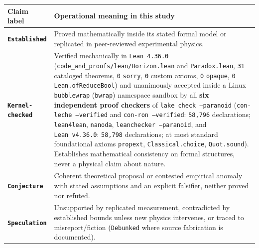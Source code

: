 \documentclass[10pt,letterpaper]{article}
\newcounter{none}
\begin{document}
{\def\LTcaptype{none} %
{\footnotesize\setlength{\tabcolsep}{3.8pt}\renewcommand{\arraystretch}{1.15}
\begin{longtable}[]{@{}
  >{\raggedright\arraybackslash}p{}
  >{\raggedright\arraybackslash}p{}@{}}
\toprule\noalign{}
\begin{minipage}[b]{\linewidth}\raggedright
\textbf{Claim label}
\end{minipage} & \begin{minipage}[b]{\linewidth}\raggedright
\textbf{Operational meaning in this study}
\end{minipage} \\
\midrule\noalign{}
\endhead
\bottomrule\noalign{}
\endlastfoot
\textbf{\texttt{Established}} & Proved mathematically inside its stated
formal model or replicated in peer-reviewed experimental physics. \\
\textbf{\texttt{Kernel-\allowbreak{}checked}} & Verified mechanically in
\texttt{Lean\ 4.\allowbreak{}36.\allowbreak{}0} (\texttt{code\_\allowbreak{}and\_\allowbreak{}proofs/\allowbreak{}lean/\allowbreak{}Horizon.\allowbreak{}lean} and
\texttt{Paradox.\allowbreak{}lean}, \texttt{31} cataloged theorems, \texttt{0}
\texttt{sorry}, \texttt{0} custom axioms, \texttt{0} \texttt{opaque},
\texttt{0} \texttt{Lean.\allowbreak{}ofReduceBool}) and unanimously accepted inside
a Linux \texttt{bubblewrap} (\texttt{bwrap}) namespace sandbox by all
\textbf{six independent proof checkers} of
\texttt{lake\ check\ --paranoid} (\texttt{con-leche\ --verified} and
\texttt{con-ron\ --verified}: \texttt{58,796} declarations;
\texttt{lean4lean}, \texttt{nanoda}, \texttt{leanchecker\ --paranoid},
and \texttt{Lean\ v4.36.0}: \texttt{58,798} declarations; at most
standard foundational axioms \texttt{propext},
\texttt{Classical.\allowbreak{}choice}, \texttt{Quot.\allowbreak{}sound}). Establishes
mathematical consistency on formal structures, never a physical claim
about nature. \\
\textbf{\texttt{Conjecture}} & Coherent theoretical proposal or
contested empirical anomaly with stated assumptions and an explicit
falsifier, neither proved nor refuted. \\
\textbf{\texttt{Speculation}} & Unsupported by replicated measurement,
contradicted by established bounds unless new physics intervenes, or
traced to misreport/fiction (\texttt{Debunked} where source fabrication
is documented). \\
\end{longtable}
}
}
\end{document}
